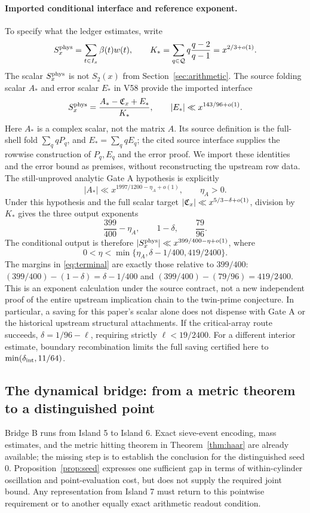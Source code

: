 \paragraph{Imported conditional interface and reference exponent.}
To specify what the ledger estimates, write
\[
S_x^{\rm phys}=\sum_{t\in I_x}\beta(t)w(t),\qquad
K_* =\sum_{q\in\mathcal Q}q\frac{q-2}{q-1}=x^{2/3+o(1)}.
\]
The scalar $S_x^{\rm phys}$ is not $S_2(x)$ from Section~\ref{sec:arithmetic}.
The source folding scalar $A_*$ and error scalar $E_*$ in V58 provide the imported interface\cite{archivev58}
\[
S_x^{\rm phys}=\frac{A_*-\mathfrak C_x+E_*}{K_*},\qquad
|E_*|\ll x^{143/96+o(1)}.
\]
Here $A_*$ is a complex scalar, not the matrix $A$. Its source definition is the full-shell fold $\sum_q qP_q$, and $E_*=\sum_q qE_q$; the cited source interface supplies the rowwise construction of $P_q,E_q$ and the error proof.
We import these identities and the error bound as premises, without reconstructing the upstream row data.
The still-unproved analytic Gate A hypothesis is explicitly
\[
|A_*|\ll x^{1997/1200-\eta_A+o(1)},\qquad \eta_A>0.
\]
Under this hypothesis and the full scalar target $|\mathfrak C_x|\ll x^{5/3-\delta+o(1)}$, division by $K_*$ gives the three output exponents
\[
\frac{399}{400}-\eta_A,\qquad 1-\delta,\qquad \frac{79}{96}.
\]
The conditional output is therefore $|S_x^{\rm phys}|\ll x^{399/400-\eta+o(1)}$, where
\begin{equation}
0<\eta<\min\{\eta_A,\delta-1/400,419/2400\}.\label{eq:terminal}
\end{equation}
The margins in \eqref{eq:terminal} are exactly those relative to $399/400$:
$(399/400)-(1-\delta)=\delta-1/400$ and
$(399/400)-(79/96)=419/2400$.
This is an exponent calculation under the source contract\cite{archivev58,archivev59,archivephysical}, not a new independent proof of the entire upstream implication chain to the twin-prime conjecture.
In particular, a saving for this paper's scalar alone does not dispense with Gate A or the historical upstream structural attachments.
If the critical-array route succeeds, $\delta=1/96-\ell$, requiring strictly $\ell<19/2400$.
For a different interior estimate, boundary recombination limits the full saving certified here to $\min(\delta_{\rm int},11/64)$.

\subsection{The dynamical bridge: from a metric theorem to a distinguished point}
Bridge B runs from Island 5 to Island 6. Exact sieve-event encoding, mass estimates, and the metric hitting theorem in Theorem~\ref{thm:haar} are already available; the missing step is to establish the conclusion for the distinguished seed $0$.
Proposition~\ref{prop:seed} expresses one sufficient gap in terms of within-cylinder oscillation and point-evaluation cost, but does not supply the required joint bound.
Any representation from Island 7 must return to this pointwise requirement or to another equally exact arithmetic readout condition.

